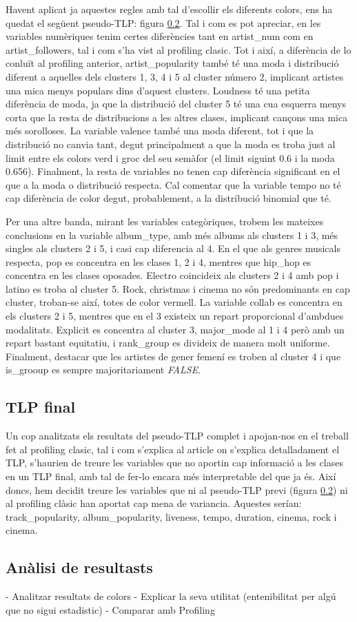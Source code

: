 \documentclass{article}
\begin{document}
Havent aplicat ja aquestes regles amb tal d'escollir els diferents colors, ens ha quedat el següent pseudo-TLP: figura \ref{}. Tal i com es pot apreciar, en les variables numèriques tenim certes diferències tant en artist\_num com en artist\_followers, tal i com s'ha vist al profiling clasic. Tot i així, a diferència de lo conluït al profiling anterior, artist\_popularity també té una moda i distribució diferent a aquelles dels clusters 1, 3, 4 i 5 al cluster número 2, implicant artistes una mica menys populars dins d'aquest clusters. Loudness té una petita diferència de moda, ja que la distribució del cluster 5 té una cua esquerra menys corta que la resta de distribucions a les altres clases, implicant cançons una mica més sorolloses. La variable valence també una moda diferent, tot i que la distribució no canvia tant, degut principalment a que la moda es troba just al limit entre els colors verd i groc del seu semàfor (el limit siguint 0.6 i la moda 0.656). Finalment, la resta de variables no tenen cap diferència significant en el que a la moda o distribució respecta. Cal comentar que la variable tempo no té cap diferència de color degut, probablement, a la distribució binomial que té.

Per una altre banda, mirant les variables categòriques, trobem les mateixes conclusions en la variable album\_type, amb més albums als clusters 1 i 3, més singles als clusters 2 i 5, i casi cap diferencia al 4. En el que als genres musicals respecta, pop es concentra en les clases 1, 2 i 4, mentres que hip\_hop es concentra en les clases oposades. Electro coincideix als clusters 2 i 4 amb pop i latino es troba al cluster 5. Rock, christmas i cinema no són predominants en cap cluster, troban-se així, totes de color vermell. La variable collab es concentra en els clusters 2 i 5, mentres que en el 3 existeix un repart proporcional d'ambdues modalitats. Explicit es concentra al cluster 3, major\_mode al 1 i 4 però amb un repart bastant equitatiu, i rank\_group es divideix de manera molt uniforme. Finalment, destacar que les artistes de gener femení es troben al cluster 4 i que is\_grooup es sempre majoritariament \textit{FALSE}.

\subsection{TLP final}

Un cop analitzats els resultats del pseudo-TLP complet i apojan-nos en el treball fet al profiling clasic, tal i com s'explica al article on s'explica detalladament el TLP, s'haurien de treure les variables que no aportin cap informació a les clases en un TLP final, amb tal de fer-lo encara més interpretable del que ja és. Així doncs, hem decidit treure les variables que ni al pseudo-TLP previ (figura \ref{}) ni al profiling clàsic han aportat cap mena de variancia. Aquestes serían: track\_popularity, album\_popularity, liveness, tempo, duration, cinema, rock i cinema.

\subsection{Anàlisi de resultasts}
- Analitzar resultats de colors
- Explicar la seva utilitat (entenibilitat per algú que no sigui estadistic)
- Comparar amb Profiling
\end{document}

